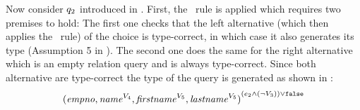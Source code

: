 \begin{example}

%
Now consider \ensuremath{\vQ_2} introduced in .
First, the \choiceE\ rule is applied which requires two premises to hold:
The first one checks that the left alternative (which then applies the \prjE\ rule) 
of the choice is type-correct, in which 
case it also generates its type (Assumption 5 in ).
The second one does the same for the right alternative which is an empty relation 
query and is always type-correct. Since both alternative are type-correct the type 
of the query is generated as shown in :
\[
\annot [(\dimMeta_2 \wedge (\neg \vThree)) \vee \texttt{false}] {( \empno, \annot [\vFour] \name, \annot [\vFive] \fname, \annot [\vFive] \lname)}
\]
%
 
%
\end{example}

\newpage


